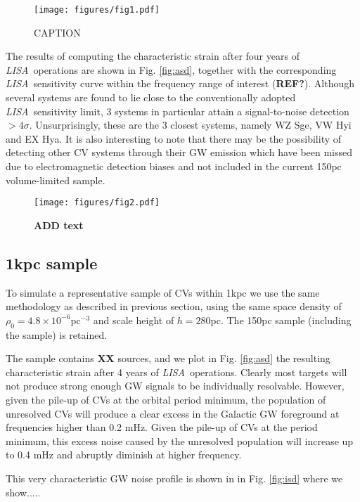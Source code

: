 \documentclass[fleqn,usenatbib]{mnras}
\newcommand{\lisa}{{\it LISA}}
\begin{document}
\begin{figure}
	\texttt{[image: figures/fig1.pdf]}
    \caption{ CAPTION   }
    \label{fig:porb}
\end{figure}

The results of computing the characteristic strain after four years of \lisa\ operations are shown in Fig. \ref{fig:asd}, together with the corresponding \lisa\ sensitivity curve within the frequency range of interest (\textbf{REF?}). Although several systems are found to lie close to the conventionally adopted \lisa\ sensitivity limit, 3 systems in particular attain a signal-to-noise detection $>4\sigma$. Unsurprisingly, these are the 3 closest systems, namely WZ Sge, VW Hyi and EX Hya. It is also interesting to note that there may be the possibility of detecting other CV systems through their GW emission which have been missed due to electromagnetic detection biases and not included in the current 150pc volume-limited sample. 


\begin{figure}
	\texttt{[image: figures/fig2.pdf]}
    \caption{\textbf{ADD text } }
    \label{fig2.py}
\end{figure}



\subsection{1kpc sample} \label{sec:500pc}

To simulate a representative sample of CVs within 1kpc we use the same methodology as described in previous section, using the same space density of $\rho_0=4.8 \times 10^{-6}$pc$^{-3}$ and scale height of $h=280$pc. The 150pc sample (including the \cite{pala20} sample) is retained.  

The sample contains \textbf{XX} sources, and we plot in Fig. \ref{fig:asd} the resulting characteristic strain after 4 years of \lisa\ operations. Clearly most targets will not produce strong enough GW signals to be individually resolvable. However, given the pile-up of CVs at the orbital period minimum, the population of unresolved CVs will produce a clear excess in the Galactic GW foreground at frequencies higher than 0.2 mHz. Given the pile-up of CVs at the period minimum, this excess noise caused by the unresolved population will increase up to 0.4 mHz and abruptly diminish at higher frequency.

This very characteristic GW noise profile is shown in in Fig. \ref{fig:isd} where we show.....
\end{document}
